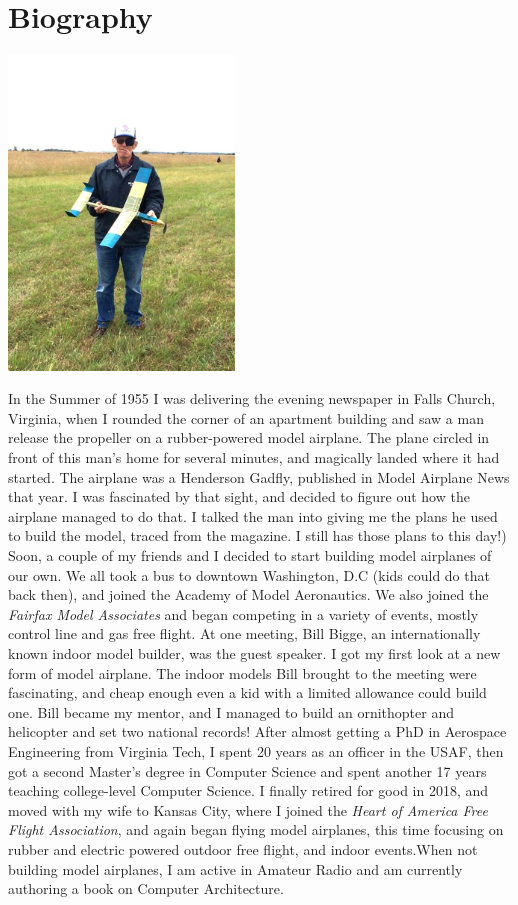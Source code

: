 \section{Biography}
\begin{centering}
\includegraphics[width=0.45\textwidth]{../assets/images/RoieBlack.jpg}
\end{centering}

In the Summer of 1955 I was delivering the evening newspaper in Falls Church,
Virginia, when I rounded the corner of an apartment building and saw a man
release the propeller on a rubber-powered model airplane. The plane circled in
front of this man's home for several minutes, and magically landed where it had
started. The airplane was a Henderson Gadfly, published in Model Airplane News
that year.  I was fascinated by that sight, and decided to figure out how the
airplane managed to do that. I talked the man into giving me the plans he used
to build the model, traced from the magazine. I still has those plans to this
day!) Soon, a couple of my friends and I decided to start building model
airplanes of our own.  We all took a bus to downtown Washington, D.C (kids
could do that back then), and joined the Academy of Model Aeronautics. We also
joined the {\it Fairfax Model Associates} and began competing in a variety of events,
mostly control line and gas free flight. At one meeting, Bill Bigge, an
internationally known indoor model builder, was the guest speaker. I got my
first look at a new form of model airplane. The indoor models Bill brought to
the meeting were fascinating, and cheap enough even a kid with a limited
allowance could build one.  Bill became my mentor, and  I managed to build an
ornithopter and helicopter and set two national records! After almost getting a
PhD in Aerospace Engineering from Virginia Tech, I spent 20 years as an
officer in the USAF, then got a second Master's degree in Computer Science and
spent another 17 years teaching college-level Computer Science. I finally
retired for good in 2018, and moved with my wife to Kansas City, where I joined
the {\it  Heart of America Free Flight Association}, and again began flying model
airplanes, this time focusing on rubber and electric powered outdoor free
flight, and indoor events.When not building model airplanes, I am active in
Amateur Radio and am currently authoring a book on Computer Architecture.
